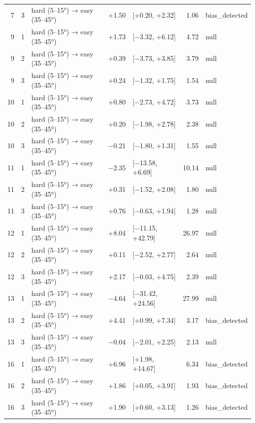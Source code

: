 \begin{table}[htbp]
\begin{tabular}{rllrlrl}
    7 & 3 & hard (5–15°) → easy (35–45°) & +1.50 & [+0.20, +2.32] & 1.06 & bias\_detected \\
    9 & 1 & hard (5–15°) → easy (35–45°) & +1.73 & [−3.32, +6.12] & 4.72 & null \\
    9 & 2 & hard (5–15°) → easy (35–45°) & +0.39 & [−3.73, +3.85] & 3.79 & null \\
    9 & 3 & hard (5–15°) → easy (35–45°) & +0.24 & [−1.32, +1.75] & 1.54 & null \\
    10 & 1 & hard (5–15°) → easy (35–45°) & +0.80 & [−2.73, +4.72] & 3.73 & null \\
    10 & 2 & hard (5–15°) → easy (35–45°) & +0.20 & [−1.98, +2.78] & 2.38 & null \\
    10 & 3 & hard (5–15°) → easy (35–45°) & −0.21 & [−1.80, +1.31] & 1.55 & null \\
    11 & 1 & hard (5–15°) → easy (35–45°) & −2.35 & [−13.58, +6.69] & 10.14 & null \\
    11 & 2 & hard (5–15°) → easy (35–45°) & +0.31 & [−1.52, +2.08] & 1.80 & null \\
    11 & 3 & hard (5–15°) → easy (35–45°) & +0.76 & [−0.63, +1.94] & 1.28 & null \\
    12 & 1 & hard (5–15°) → easy (35–45°) & +8.04 & [−11.15, +42.79] & 26.97 & null \\
    12 & 2 & hard (5–15°) → easy (35–45°) & +0.11 & [−2.52, +2.77] & 2.64 & null \\
    12 & 3 & hard (5–15°) → easy (35–45°) & +2.17 & [−0.03, +4.75] & 2.39 & null \\
    13 & 1 & hard (5–15°) → easy (35–45°) & −4.64 & [−31.42, +24.56] & 27.99 & null \\
    13 & 2 & hard (5–15°) → easy (35–45°) & +4.41 & [+0.99, +7.34] & 3.17 & bias\_detected \\
    13 & 3 & hard (5–15°) → easy (35–45°) & −0.04 & [−2.01, +2.25] & 2.13 & null \\
    16 & 1 & hard (5–15°) → easy (35–45°) & +6.96 & [+1.98, +14.67] & 6.34 & bias\_detected \\
    16 & 2 & hard (5–15°) → easy (35–45°) & +1.86 & [+0.05, +3.91] & 1.93 & bias\_detected \\
    16 & 3 & hard (5–15°) → easy (35–45°) & +1.90 & [+0.60, +3.13] & 1.26 & bias\_detected \\
    \bottomrule
  \end{tabular}
\end{table}
